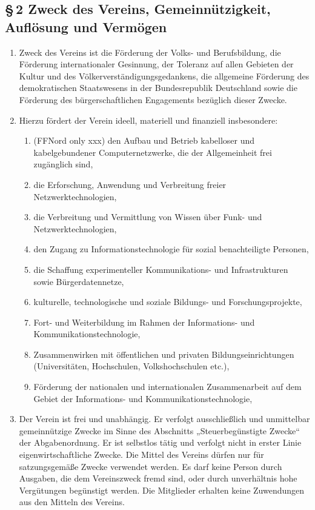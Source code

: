 \documentclass[12pt,a4paper]{article}
\begin{document}
\subsection*{§\,2 Zweck des Vereins, Gemeinnützigkeit, Auflösung und Vermögen}
\begin{enumerate}
\item Zweck des Vereins ist die Förderung der Volks- und Berufsbildung, die Förderung internationaler Gesinnung, der Toleranz auf allen Gebieten der Kultur und des Völkerverständigungsgedankens, die allgemeine Förderung des demokratischen Staatswesens in der Bundesrepublik Deutschland sowie die Förderung des bürgerschaftlichen Engagements bezüglich dieser Zwecke.
\item Hierzu fördert der Verein ideell, materiell und finanziell insbesondere:
\begin{enumerate}
\item (FFNord only xxx) den Aufbau und Betrieb kabelloser und
kabelgebundener Computernetzwerke, die der Allgemeinheit frei zugänglich sind,
\item die Erforschung, Anwendung und Verbreitung freier Netz\-werktechnologien,
\item die Verbreitung und Vermittlung von Wissen über Funk- und Netz\-werktechnologien,
\item den Zugang zu Informationstechnologie für sozial benachteiligte Personen,
\item die Schaffung experimenteller Kommunikations- und Infrastrukturen sowie Bürgerdatennetze,
\item kulturelle, technologische und soziale Bildungs- und Forschungsprojekte,
\item Fort- und Weiterbildung im Rahmen der Informations- und Kommunikationstechnologie,
\item Zusammenwirken mit öffentlichen und privaten Bildungseinrichtungen (Universitäten, Hochschulen, Volkshochschulen etc.),
\item Förderung der nationalen und internationalen Zusammenarbeit auf dem Gebiet der Informations- und Kommunikationstechnologie,
\end{enumerate}
\item Der Verein ist frei und unabhängig. Er verfolgt ausschließlich und unmittelbar gemeinnützige Zwecke im Sinne des Abschnitts „Steuerbegünstigte Zwecke“ der Abgabenordnung. Er ist selbstlos tätig und verfolgt nicht in erster Linie eigenwirtschaftliche Zwecke. Die Mittel des Vereins dürfen nur für satzungsgemäße Zwecke verwendet werden. Es darf keine Person durch Ausgaben, die dem Vereinszweck fremd sind, oder durch unverhältnis hohe Vergütungen begünstigt werden. Die Mitglieder erhalten keine Zuwendungen aus den Mitteln des Vereins.

\end{enumerate}
\end{document}
